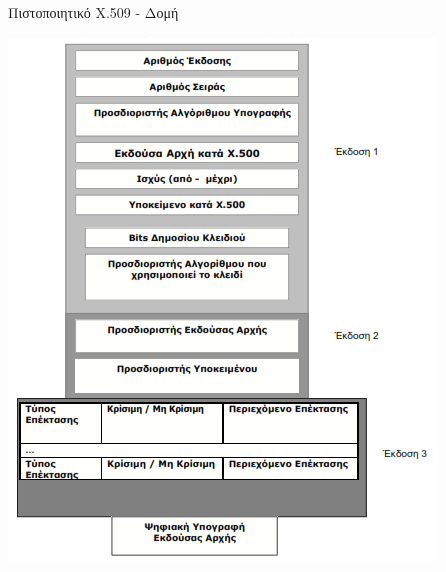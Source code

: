 \documentclass{beamer}
\begin{document}
\begin{frame}{Πιστοποιητικό X.509 - Δομή}
    \begin{center}
    \includegraphics[scale=0.5]{x509.PNG}
    \end{center} 
\end{frame}
\end{document}
